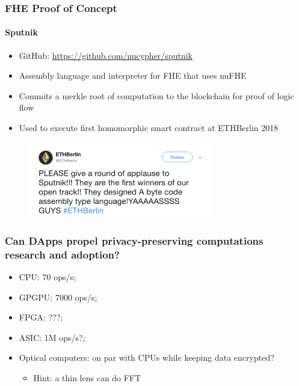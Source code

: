 \documentclass[xetex,mathsans,sans,aspectratio=169]{beamer}
\begin{document}
    \begin{frame}
      \frametitle{FHE Proof of Concept}
      \framesubtitle{Sputnik}
      \begin{itemize}
        \item GitHub: \url{https://github.com/nucypher/sputnik}
        \item Assembly language and interpreter for FHE that uses nuFHE
        \item Commits a merkle root of computation to the blockchain for proof of logic flow
        \item Used to execute first homomorphic smart contract at ETHBerlin 2018
      \end{itemize}
      \begin{figure}
        \centering
        \includegraphics[width=8cm]{pdf/sputnik-tweet.pdf}
      \end{figure}
    \end{frame}

    \begin{frame}
        \frametitle{Can DApps propel privacy-preserving computations\\
        research and adoption?}
        \begin{itemize}
            \item CPU: $70$ ops/s;
            \item GPGPU: $7000$ ops/s;
            \item FPGA: ???;
            \item ASIC: 1M ops/s?;
            \item Optical computers: on par with CPUs while keeping data encrypted?
            \begin{itemize}
                \item Hint: a thin lens can do FFT
            \end{itemize}
        \end{itemize}
    \end{frame}
\end{document}
